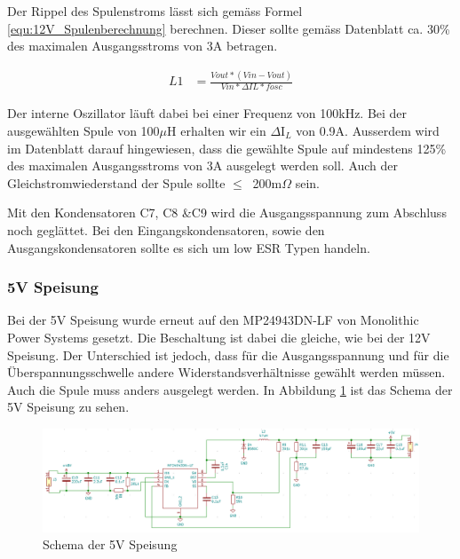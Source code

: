 Der Rippel des Spulenstroms lässt sich gemäss Formel \ref{equ:12V_Spulenberechnung} berechnen. Dieser sollte gemäss Datenblatt ca. 30\% des maximalen Ausgangsstroms von 3A betragen. \cite{mouser_mp24943dn-lf_nodate} 

\begin{align}
L1 &= \frac{Vout*(Vin-Vout)}{Vin*\Delta IL*fosc}
\label{equ:12V_Spulenberechnung}
\end{align}

Der interne Oszillator läuft dabei bei einer Frequenz von 100kHz. Bei der ausgewählten Spule von 100$\mu$H erhalten wir ein $\Delta$I$_{L}$ von 0.9A. Ausserdem wird im Datenblatt darauf hingewiesen, dass die gewählte Spule auf mindestens 125\% des maximalen Ausgangsstroms von 3A ausgelegt werden soll. Auch der Gleichstromwiederstand der Spule sollte $ \leq \ $ 200m$\Omega$  sein. \cite{mouser_mp24943dn-lf_nodate}

Mit den Kondensatoren C7, C8 \&C9 wird die Ausgangsspannung zum Abschluss noch geglättet. Bei den Eingangskondensatoren, sowie den Ausgangskondensatoren sollte es sich um low ESR Typen handeln. \cite{mouser_mp24943dn-lf_nodate}

\subsubsection{5V Speisung}
\label{subsubsec:5V_Speisung}

Bei der 5V Speisung wurde erneut auf den MP24943DN-LF von Monolithic Power Systems gesetzt. Die Beschaltung ist dabei die gleiche, wie bei der 12V Speisung. Der Unterschied ist jedoch, dass für die Ausgangsspannung und für die Überspannungsschwelle andere Widerstandsverhältnisse gewählt werden müssen. Auch die Spule muss anders ausgelegt werden. In Abbildung \ref{fig:5VSpeisung_Schema} ist das Schema der 5V Speisung zu sehen. \cite{mouser_mp24943dn-lf_nodate} 
 
\begin{figure}[h!]
\centering
\includegraphics[width=\textwidth]{graphics/5V_Speisung_Schema.png}
\caption{Schema der 5V Speisung}
\label{fig:5VSpeisung_Schema}
\end{figure} 
 
